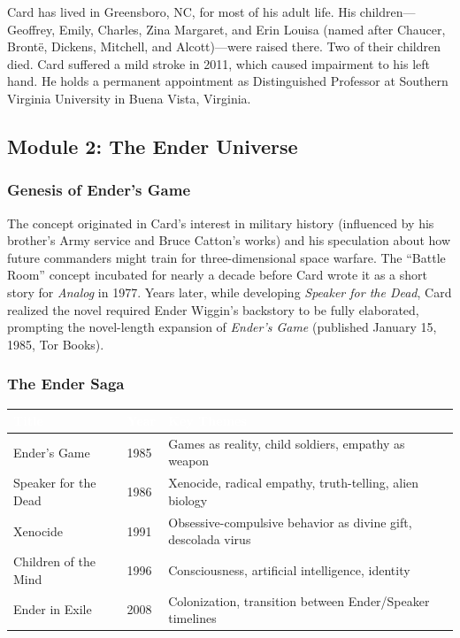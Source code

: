 \documentclass[11pt,letterpaper]{article}
\newcommand{\tableheader}[1]{\textbf{\sffamily\textcolor{white}{#1}}}
\begin{document}
Card has lived in Greensboro, NC, for most of his adult life. His children---Geoffrey, Emily, Charles, Zina Margaret, and Erin Louisa (named after Chaucer, Bront\"{e}, Dickens, Mitchell, and Alcott)---were raised there. Two of their children died. Card suffered a mild stroke in 2011, which caused impairment to his left hand. He holds a permanent appointment as Distinguished Professor at Southern Virginia University in Buena Vista, Virginia.

\subsection{Module 2: The Ender Universe}

\subsubsection{Genesis of Ender's Game}

The concept originated in Card's interest in military history (influenced by his brother's Army service and Bruce Catton's works) and his speculation about how future commanders might train for three-dimensional space warfare. The ``Battle Room'' concept incubated for nearly a decade before Card wrote it as a short story for \textit{Analog} in 1977. Years later, while developing \textit{Speaker for the Dead}, Card realized the novel required Ender Wiggin's backstory to be fully elaborated, prompting the novel-length expansion of \textit{Ender's Game} (published January 15, 1985, Tor Books).

\subsubsection{The Ender Saga}

\begin{center}
\begin{tabularx}{\textwidth}{L{4cm}C{1.5cm}X}
\toprule
{}
\tableheader{Title} & \tableheader{Year} & \tableheader{Key Themes} \\
\midrule
Ender's Game & 1985 & Games as reality, child soldiers, empathy as weapon \\
Speaker for the Dead & 1986 & Xenocide, radical empathy, truth-telling, alien biology \\
Xenocide & 1991 & Obsessive-compulsive behavior as divine gift, descolada virus \\
Children of the Mind & 1996 & Consciousness, artificial intelligence, identity \\
Ender in Exile & 2008 & Colonization, transition between Ender/Speaker timelines \\
\bottomrule
\end{tabularx}
\end{center}
\end{document}
